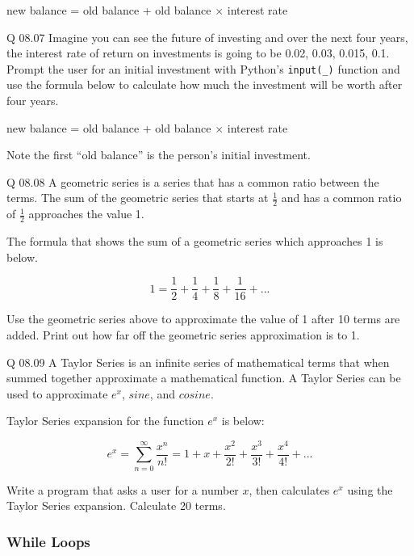 \documentclass{book}
\newenvironment{problems}{}{}  %
\begin{document}
\begin{problems}
new balance = old balance + old balance \(\times\) interest rate

Q 08.07 Imagine you can see the future of investing and over the next
four years, the interest rate of return on investments is going to be
0.02, 0.03, 0.015, 0.1. Prompt the user for an initial investment with
Python's \lstinline!input(_)! function and use the formula below to
calculate how much the investment will be worth after four years.

new balance = old balance + old balance \(\times\) interest rate

Note the first ``old balance'' is the person's initial investment.

Q 08.08 A geometric series is a series that has a common ratio between
the terms. The sum of the geometric series that starts at
\(\frac{1}{2}\) and has a common ratio of \(\frac{1}{2}\) approaches the
value 1.

The formula that shows the sum of a geometric series which approaches 1
is below.

\[ 1 = \frac{1}{2} + \frac{1}{4} + \frac{1}{8} + \frac{1}{16} + ... \]

Use the geometric series above to approximate the value of 1 after 10
terms are added. Print out how far off the geometric series
approximation is to 1.

Q 08.09 A Taylor Series is an infinite series of mathematical terms that
when summed together approximate a mathematical function. A Taylor
Series can be used to approximate \(e^x\), \(sine\), and \(cosine\).

Taylor Series expansion for the function \(e^x\) is below:

\[  {e^x} = \sum\limits_{n = 0}^\infty  {\frac{{{x^n}}}{{n!}}}  = 1 + x + \frac{{{x^2}}}{{2!}} + \frac{{{x^3}}}{{3!}} + \frac{{{x^4}}}{{4!}} + ... \]

Write a program that asks a user for a number \(x\), then calculates
\(e^x\) using the Taylor Series expansion. Calculate 20 terms.
        \end{problems}

    




    
        \subsubsection{While Loops}\label{while-loops}
    
\end{document}
